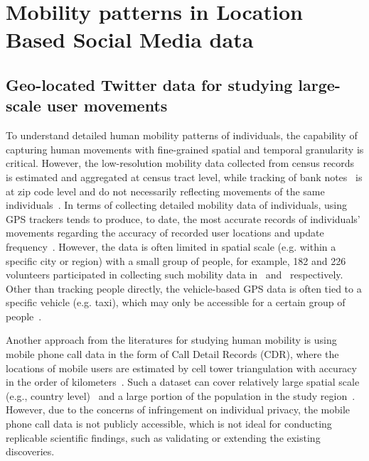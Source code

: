 \documentclass[a4paper, 11pt]{article}
\begin{document}
\section{Mobility patterns in Location Based Social Media data}
\subsection{Geo-located Twitter data for studying large-scale user movements}
To understand detailed human mobility patterns of individuals, the capability of capturing human movements with fine-grained spatial and temporal granularity is critical.
However, the low-resolution mobility data collected from census records~\citep{greenwood1985human} is estimated and aggregated at census tract level, while tracking of bank notes~\citep{brockmann2006scaling} is at zip code level and do not necessarily reflecting movements of the same individuals~\citep{gonzalez2008understanding}.
In terms of collecting detailed mobility data of individuals, using GPS trackers tends to produce, to date, the most accurate records of individuals' movements regarding the accuracy of recorded user locations and update frequency~\citep{zheng2008understanding}. However, the data is often limited in spatial scale (e.g. within a specific city or region) with a small group of people, for example, 182 and 226 volunteers participated in collecting such mobility data in~\citep{zheng2010geolife} and~\citep{rhee2011levy} respectively. Other than tracking people directly, the vehicle-based GPS data is often tied to a specific vehicle (e.g. taxi), which may only be accessible for a certain group of people~\citep{kung2014exploring}. 

Another approach from the literatures for studying human mobility is using mobile phone call data in the form of Call Detail Records (CDR), where the locations of mobile users are estimated by cell tower triangulation with accuracy in the order of kilometers~\citep{gonzalez2008understanding,sevtsuk2010does,kung2014exploring}. 
Such a dataset can cover relatively large spatial scale (e.g., country level)~\citep{becker2013human,sobolevsky2013delineating} and a large portion of the population in the study region~\citep{kung2014exploring}. However, due to the concerns of infringement on individual privacy, the mobile phone call data is not publicly accessible, which is not ideal  for conducting replicable scientific findings, such as validating or extending the existing discoveries.
\end{document}
